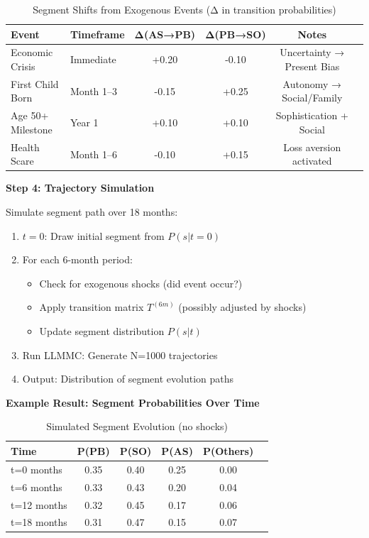 \begin{table}[htbp]
\centering
\caption{Segment Shifts from Exogenous Events (Δ in transition probabilities)}
\label{tab:19-segment-shocks}
\renewcommand{\arraystretch}{1.2}
\footnotesize
\begin{tabular}{@{}llcccc@{}}
\toprule
\textbf{Event} & \textbf{Timeframe} & \textbf{Δ(AS→PB)} & \textbf{Δ(PB→SO)} & \textbf{Notes} \\
\midrule
Economic Crisis & Immediate & +0.20 & -0.10 & Uncertainty → Present Bias \\
First Child Born & Month 1--3 & -0.15 & +0.25 & Autonomy → Social/Family \\
Age 50+ Milestone & Year 1 & +0.10 & +0.10 & Sophistication + Social \\
Health Scare & Month 1--6 & -0.10 & +0.15 & Loss aversion activated \\
\bottomrule
\end{tabular}
\end{table}

\textbf{Step 4: Trajectory Simulation}

Simulate segment path over 18 months:

\begin{enumerate}
\item $t=0$: Draw initial segment from $P(s | t=0)$
\item For each 6-month period:
  \begin{itemize}[nosep]
  \item Check for exogenous shocks (did event occur?)
  \item Apply transition matrix $T^{(6m)}$ (possibly adjusted by shocks)
  \item Update segment distribution $P(s | t)$
  \end{itemize}
\item Run LLMMC: Generate N=1000 trajectories
\item Output: Distribution of segment evolution paths
\end{enumerate}

\textbf{Example Result: Segment Probabilities Over Time}

\begin{table}[htbp]
\centering
\caption{Simulated Segment Evolution (no shocks)}
\label{tab:19-segment-evolution}
\renewcommand{\arraystretch}{1.3}
\small
\begin{tabular}{@{}lccccc@{}}
\toprule
\textbf{Time} & \textbf{P(PB)} & \textbf{P(SO)} & \textbf{P(AS)} & \textbf{P(Others)} \\
\midrule
t=0 months & 0.35 & 0.40 & 0.25 & 0.00 \\
t=6 months & 0.33 & 0.43 & 0.20 & 0.04 \\
t=12 months & 0.32 & 0.45 & 0.17 & 0.06 \\
t=18 months & 0.31 & 0.47 & 0.15 & 0.07 \\
\bottomrule
\end{tabular}
\end{table}

